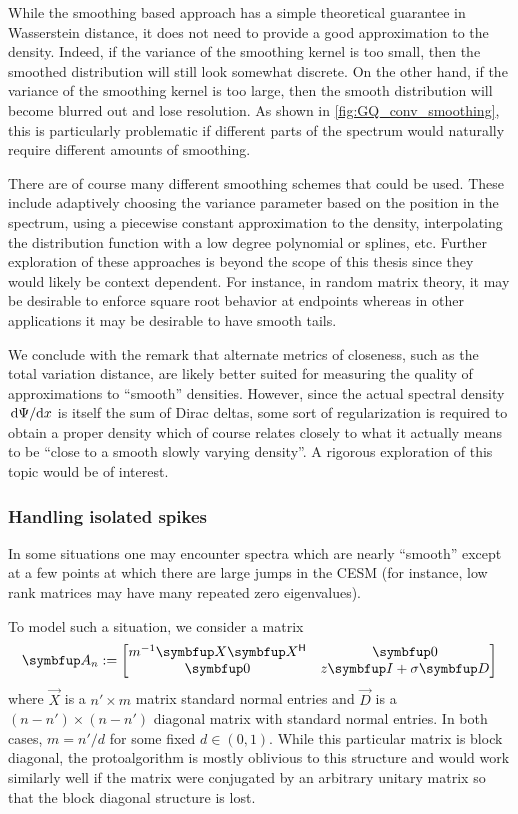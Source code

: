 While the smoothing based approach has a simple theoretical guarantee in Wasserstein distance, it does not need to provide a good approximation to the density. 
Indeed, if the variance of the smoothing kernel is too small, then the smoothed distribution will still look somewhat discrete. 
On the other hand, if the variance of the smoothing kernel is too large, then the smooth distribution will become blurred out and lose resolution.
As shown in \cref{fig:GQ_conv_smoothing}, this is particularly problematic if different parts of the spectrum would naturally require different amounts of smoothing.

There are of course many different smoothing schemes that could be used. 
These include adaptively choosing the variance parameter based on the position in the spectrum, using a piecewise constant approximation to the density, interpolating the distribution function with a low degree polynomial or splines, etc. 
Further exploration of these approaches is beyond the scope of this thesis since they would likely be context dependent. 
For instance, in random matrix theory, it may be desirable to enforce square root behavior at endpoints whereas in other applications it may be desirable to have smooth tails.


We conclude with the remark that alternate metrics of closeness, such as the total variation distance, are likely better suited for measuring the quality of approximations to ``smooth'' densities.
However, since the actual spectral density \( \,\textup{d}\Psi/\textup{d}{x} \) is itself the sum of Dirac deltas, some sort of regularization is required to obtain a proper density \cite{lin_saad_yang_16} which of course relates closely to what it actually means to be ``close to a smooth slowly varying density''.
A rigorous exploration of this topic would be of interest. 


\subsubsection{Handling isolated spikes}

In some situations one may encounter spectra which are nearly ``smooth'' except at a few points at which there are large jumps in the CESM (for instance, low rank matrices may have many repeated zero eigenvalues). 

To model such a situation, we consider a matrix 
\begin{equation*}
    \vec{A}_n := 
    \begin{bmatrix}
        m^{-1} \vec{X}\vec{X}^\cT & \vec{0} \\
        \vec{0} & z\vec{I} + \sigma \vec{D}
    \end{bmatrix}
\end{equation*}
where \( \vec{X} \) is a \( n'\times m \) matrix standard normal entries and \( \vec{D} \) is a \( (n-n')\times (n-n') \) diagonal matrix with standard normal entries. 
In both cases,  \( m = n'/d \) for some fixed \( d\in(0,1) \). 
While this particular matrix is block diagonal, the protoalgorithm is mostly oblivious to this structure and would work similarly well if the matrix were conjugated by an arbitrary unitary matrix so that the block diagonal structure is lost.

